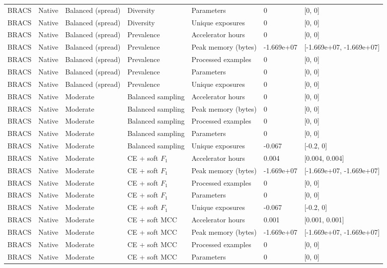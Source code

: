\begin{longtable}{lllllll}
BRACS & Native & Balanced (spread) & Diversity & Parameters & 0 & [0, 0] \\
BRACS & Native & Balanced (spread) & Diversity & Unique exposures & 0 & [0, 0] \\
BRACS & Native & Balanced (spread) & Prevalence & Accelerator hours & 0 & [0, 0] \\
BRACS & Native & Balanced (spread) & Prevalence & Peak memory (bytes) & -1.669e+07 & [-1.669e+07, -1.669e+07] \\
BRACS & Native & Balanced (spread) & Prevalence & Processed examples & 0 & [0, 0] \\
BRACS & Native & Balanced (spread) & Prevalence & Parameters & 0 & [0, 0] \\
BRACS & Native & Balanced (spread) & Prevalence & Unique exposures & 0 & [0, 0] \\
BRACS & Native & Moderate & Balanced sampling & Accelerator hours & 0 & [0, 0] \\
BRACS & Native & Moderate & Balanced sampling & Peak memory (bytes) & 0 & [0, 0] \\
BRACS & Native & Moderate & Balanced sampling & Processed examples & 0 & [0, 0] \\
BRACS & Native & Moderate & Balanced sampling & Parameters & 0 & [0, 0] \\
BRACS & Native & Moderate & Balanced sampling & Unique exposures & -0.067 & [-0.2, 0] \\
BRACS & Native & Moderate & CE + soft $F_1$ & Accelerator hours & 0.004 & [0.004, 0.004] \\
BRACS & Native & Moderate & CE + soft $F_1$ & Peak memory (bytes) & -1.669e+07 & [-1.669e+07, -1.669e+07] \\
BRACS & Native & Moderate & CE + soft $F_1$ & Processed examples & 0 & [0, 0] \\
BRACS & Native & Moderate & CE + soft $F_1$ & Parameters & 0 & [0, 0] \\
BRACS & Native & Moderate & CE + soft $F_1$ & Unique exposures & -0.067 & [-0.2, 0] \\
BRACS & Native & Moderate & CE + soft MCC & Accelerator hours & 0.001 & [0.001, 0.001] \\
BRACS & Native & Moderate & CE + soft MCC & Peak memory (bytes) & -1.669e+07 & [-1.669e+07, -1.669e+07] \\
BRACS & Native & Moderate & CE + soft MCC & Processed examples & 0 & [0, 0] \\
BRACS & Native & Moderate & CE + soft MCC & Parameters & 0 & [0, 0] \\

\end{longtable}
